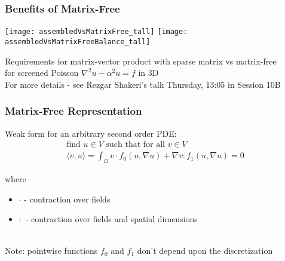 \documentclass{beamer}
\begin{document}

\begin{frame}
\begin{center}
\frametitle{Benefits of Matrix-Free}

\texttt{[image: assembledVsMatrixFree\_tall]}
\hspace{1cm}
\texttt{[image: assembledVsMatrixFreeBalance\_tall]}

{\small Requirements for matrix-vector product with sparse matrix vs matrix-free\\ for screened Poisson $\nabla^2 u - \alpha^2 u = f$ in 3D}\\

For more details - see Rezgar Shakeri's talk Thursday, 13:05 in Session 10B

\end{center}
\end{frame}


\begin{frame}
\begin{center}
\frametitle{Matrix-Free Representation}

Weak form for an arbitrary second order PDE:\\

\begin{equation}
\begin{array}{c}
\text{find } u \in V \text{ such that for all } v \in V\\
\langle v, u \rangle = \int_{\Omega} v \cdot f_0 \left( u, \nabla u \right) + \nabla v : f_1 \left( u, \nabla u \right) = 0
\end{array}
\label{eq:weak_form}
\end{equation}

\begin{flushleft}
where
\end{flushleft}

\begin{itemize}

\item $\cdot$ - contraction over fields\\

\item $:$ - contraction over fields and spatial dimensions\\

\end{itemize}

~\\

Note: pointwise functions $f_0$ and $f_1$ don't depend upon the discretization\\

\end{center}
\end{frame}
\end{document}
